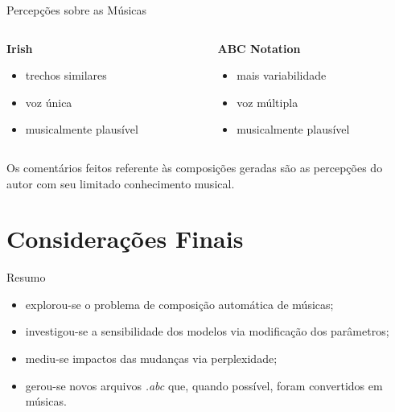\documentclass{beamer}
\begin{document}
    \begin{frame}{Percepções sobre as Músicas}
        \begin{columns}[onlytextwidth,t]
            \begin{column}{0.48\textwidth}
                \centering
                \textbf{Irish}
                \vspace{0.1cm}
                \begin{itemize}
                    \item trechos similares
                    \item voz única
                    \item musicalmente plausível
                \end{itemize}
            \end{column}

            \begin{column}{0.48\textwidth}
                \centering
                \textbf{ABC Notation}
                \vspace{0.1cm}
                \begin{itemize}
                    \item mais variabilidade
                    \item voz múltipla
                    \item musicalmente plausível
                \end{itemize}
            \end{column}
        \end{columns}
        
        \vspace{1cm}
        Os comentários feitos referente às composições geradas são as percepções do autor com seu limitado conhecimento musical.
    \end{frame}



\section{Considerações Finais}
    \begin{frame}{Resumo}
        \begin{itemize}
            \justifying
            \item explorou-se o problema de composição automática de músicas; 
            \item investigou-se a sensibilidade dos modelos via modificação dos parâmetros;
            \item mediu-se impactos das mudanças via perplexidade;
            \item gerou-se novos arquivos \textit{.abc} que, quando possível, foram convertidos em músicas.
        \end{itemize}
    \end{frame}
    
\end{document}
